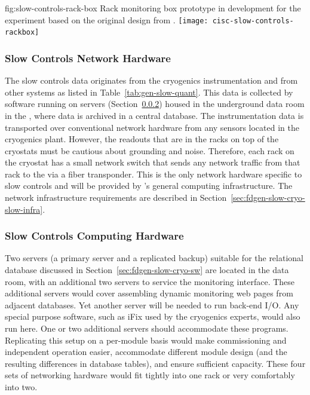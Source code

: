 \begin{dunefigure}{fig:slow-controls-rack-box}
{Rack monitoring box prototype in development for the  experiment based on the original design from .}
\texttt{[image: cisc-slow-controls-rackbox]}
\end{dunefigure}


\subsubsection{Slow Controls Network Hardware}
\label{sec:fdgen-slow-cryo-slow-network}
The slow controls data originates from the cryogenics instrumentation and from other systems as listed in Table~\ref{tab:gen-slow-quant}. This data is collected by software running on servers
(Section~\ref{sec:fdgen-slow-cryo-slow-compute})
housed in the underground data room in the ,
where data is archived in a central  database.
The instrumentation data is transported over
conventional network hardware from any sensors located in the cryogenics
plant.  However, the readouts that are in the racks on top of the
cryostats must be cautious about grounding and noise.  Therefore, each
rack on the cryostat has a small network switch that sends
any network traffic from that rack to the  via a fiber transponder.
This is the only network hardware specific to slow controls and will be provided by %
's  
general computing infrastructure.  
The network infrastructure requirements are described in
Section~\ref{sec:fdgen-slow-cryo-slow-infra}.

\subsubsection{Slow Controls Computing Hardware}
\label{sec:fdgen-slow-cryo-slow-compute}
Two servers (a primary server and a replicated backup) suitable for the relational database discussed
in Section~\ref{sec:fdgen-slow-cryo-sw} are located in the  data
room, with an additional
two servers to service the  monitoring interface.  These additional servers would cover assembling dynamic  monitoring web pages from adjacent
databases. Yet another server will be needed to run back-end I/O.  Any special purpose software, such as iFix used by the cryogenics experts, would
also run here. One or two additional servers should accommodate these programs.
Replicating this setup on a per-module basis would make commissioning and independent operation easier, accommodate different module
design (and the resulting differences in database tables), and ensure
sufficient capacity.  These four sets of networking hardware would fit tightly into one rack or very comfortably into two. 




